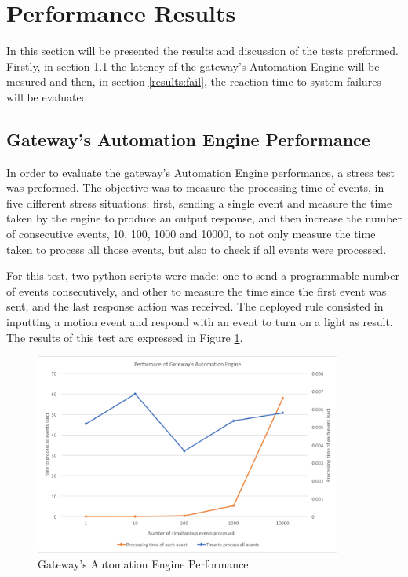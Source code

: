 \section{Performance Results}
\label{results:results}

In this section will be presented the results and discussion of the tests preformed. Firstly, in section \ref{results:cep} the latency of the gateway's Automation Engine will be mesured and then, in section \ref{results:fail}, the reaction time to system failures will be evaluated.


\subsection{Gateway's Automation Engine Performance}
\label{results:cep}

In order to evaluate the gateway's Automation Engine performance, a stress test was preformed. The objective was to measure the processing time of events, in five different stress situations: first, sending a single event and measure the time taken by the engine to produce an output response, and then increase the number of consecutive events, 10, 100, 1000 and 10000, to not only measure the time taken to process all those events, but also to check if all events were processed. 

For this test, two python scripts were made: one to send a programmable number of events consecutively, and other to measure the time since the first event was sent, and the last response action was received. The deployed rule consisted in inputting a motion event and respond with an event to turn on a light as result. The results of this test are expressed in Figure \ref{fig:performance}.

\begin{figure}[H]
	\centering
	\includegraphics[width=0.9\textwidth]{figures/performance.png}
	\caption{Gateway's Automation Engine Performance.}
	\label{fig:performance}
\end{figure}

